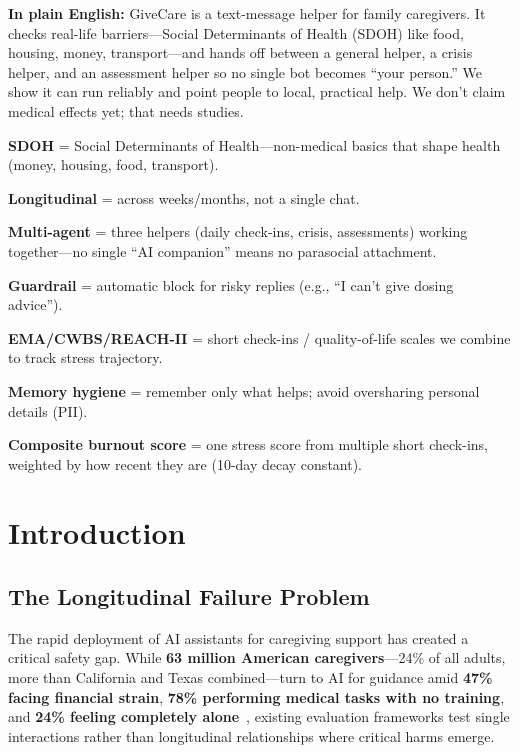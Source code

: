 \documentclass{article}
\begin{document}
\begin{tcolorbox}[colback=blue!5!white,colframe=blue!75!black,title=\textbf{Plain-Language Summary}]
\textbf{In plain English:} GiveCare is a text-message helper for family caregivers. It checks real-life barriers—Social Determinants of Health (SDOH) like food, housing, money, transport—and hands off between a general helper, a crisis helper, and an assessment helper so no single bot becomes ``your person.'' We show it can run reliably and point people to local, practical help. We don't claim medical effects yet; that needs studies.
\end{tcolorbox}%

\begin{tcolorbox}[colback=gray!5!white,colframe=gray!75!black,title=\textbf{Key Terms}]
\textbf{SDOH} = Social Determinants of Health—non-medical basics that shape health (money, housing, food, transport).

\textbf{Longitudinal} = across weeks/months, not a single chat.

\textbf{Multi-agent} = three helpers (daily check-ins, crisis, assessments) working together—no single ``AI companion'' means no parasocial attachment.

\textbf{Guardrail} = automatic block for risky replies (e.g., ``I can't give dosing advice'').

\textbf{EMA/CWBS/REACH-II} = short check-ins / quality-of-life scales we combine to track stress trajectory.

\textbf{Memory hygiene} = remember only what helps; avoid oversharing personal details (PII).

\textbf{Composite burnout score} = one stress score from multiple short check-ins, weighted by how recent they are (10-day decay constant).
\end{tcolorbox}%
%
\normalsize%
\section{Introduction}%
\label{sec:Introduction}%
\subsection{The Longitudinal Failure Problem}

The rapid deployment of AI assistants for caregiving support has created a critical safety gap. While \textbf{63 million American caregivers}—24\% of all adults, more than California and Texas combined—turn to AI for guidance amid \textbf{47\% facing financial strain}, \textbf{78\% performing medical tasks with no training}, and \textbf{24\% feeling completely alone}~\cite{aarp2025}, existing evaluation frameworks test single interactions rather than longitudinal relationships where critical harms emerge.
\end{document}
